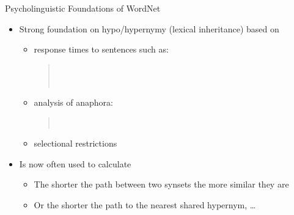 \documentclass{beamer}
\begin{document}
\begin{frame}{Psycholinguistic Foundations of WordNet}

\MyLogo{}

\begin{itemize}
\item Strong foundation on hypo/hypernymy (lexical inheritance) based on
  \begin{itemize}
  \item   response times to sentences such as:
    \begin{quote}%
      \\
      \\
    \end{quote}
  \item analysis of anaphora:
    \begin{quote}%
      \\
    \end{quote}
  \item selectional restrictions
  \end{itemize}
\item Is now often used to calculate 
  \begin{itemize}
  \item The shorter the path between two synsets the more similar they are
  \item Or the shorter the path to the nearest shared hypernym, \ldots
  \end{itemize}
\end{itemize}
\end{frame}
\end{document}
